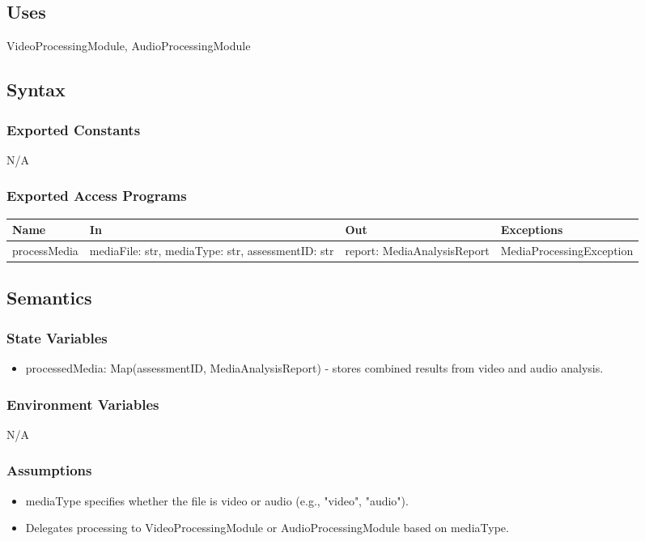 \documentclass[12pt, titlepage]{article}
\begin{document}
\subsection{Uses}
VideoProcessingModule, AudioProcessingModule

\subsection{Syntax}

\subsubsection{Exported Constants}
N/A

\subsubsection{Exported Access Programs}
\begin{center}
  \begin{tabular}{p{3cm} p{4cm} p{4cm} p{5cm}}
  \hline
  \textbf{Name} & \textbf{In} & \textbf{Out} & \textbf{Exceptions} \\
  \hline
  processMedia & \raggedright\arraybackslash mediaFile: str, mediaType: str, assessmentID: str & \raggedright\arraybackslash report: MediaAnalysisReport & \raggedright\arraybackslash MediaProcessingException \\
  \end{tabular}
\end{center}

\subsection{Semantics}

\subsubsection{State Variables}
\begin{itemize}
\item processedMedia: Map(assessmentID, MediaAnalysisReport) - stores combined results from video and audio analysis.
\end{itemize}

\subsubsection{Environment Variables}
N/A

\subsubsection{Assumptions}
\begin{itemize}
\item mediaType specifies whether the file is video or audio (e.g., "video", "audio").
\item Delegates processing to VideoProcessingModule or AudioProcessingModule based on mediaType.
\end{itemize}
\end{document}

